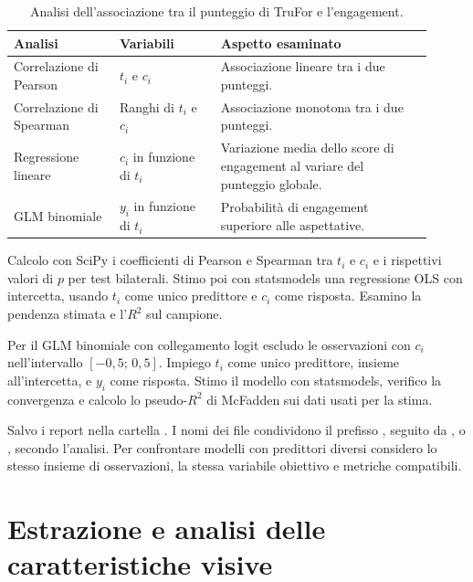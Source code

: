 \begin{table}[htbp]
    \centering
    \small
    \caption{Analisi dell'associazione tra il punteggio di TruFor e l'engagement.}
    \label{tab:metodi-trufor-analisi}
    \begin{tabular}{@{}>{\raggedright\arraybackslash}p{0.23\linewidth}>{\raggedright\arraybackslash}p{0.22\linewidth}>{\raggedright\arraybackslash}p{0.46\linewidth}@{}}
        \toprule
        Analisi & Variabili & Aspetto esaminato \\
        \midrule
        Correlazione di Pearson & $t_i$ e $c_i$ & Associazione lineare tra i due punteggi. \\
        \addlinespace
        Correlazione di Spearman & Ranghi di $t_i$ e $c_i$ & Associazione monotona tra i due punteggi. \\
        \addlinespace
        Regressione lineare & $c_i$ in funzione di $t_i$ & Variazione media dello score di engagement al variare del punteggio globale. \\
        \addlinespace
        GLM binomiale & $y_i$ in funzione di $t_i$ & Probabilità di engagement superiore alle aspettative. \\
        \bottomrule
    \end{tabular}
\end{table}

Calcolo con SciPy i coefficienti di Pearson e Spearman tra $t_i$ e $c_i$ e i rispettivi valori di $p$ per test bilaterali. Stimo poi con statsmodels una regressione OLS con intercetta, usando $t_i$ come unico predittore e $c_i$ come risposta. Esamino la pendenza stimata e l'$R^2$ sul campione.

Per il GLM binomiale con collegamento logit escludo le osservazioni con $c_i$ nell'intervallo $[-0{,}5;\,0{,}5]$. Impiego $t_i$ come unico predittore, insieme all'intercetta, e $y_i$ come risposta. Stimo il modello con statsmodels, verifico la convergenza e calcolo lo pseudo-$R^2$ di McFadden sui dati usati per la stima.

Salvo i report nella cartella . I nomi dei file condividono il prefisso , seguito da ,  o , secondo l'analisi. Per confrontare modelli con predittori diversi considero lo stesso insieme di osservazioni, la stessa variabile obiettivo e metriche compatibili.

\section{Estrazione e analisi delle caratteristiche visive}
\label{sec:metodi-feature-visive}

